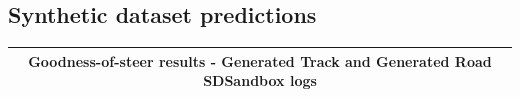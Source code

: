 
\subsection{Synthetic dataset predictions}


\begin{table}[]
\begin{center}
\begin{tabular}{|l|l|l|l|l|l|}
\hline
\multicolumn{6}{|c|}{Goodness-of-steer results - Generated Track and Generated Road SDSandbox logs} \\ \hline




\end{tabular}
\end{center}
\end{table}
